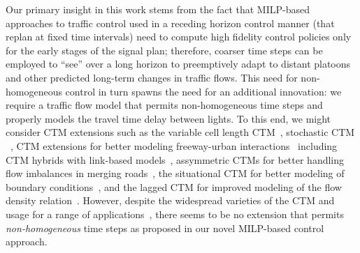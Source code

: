 {Our primary insight in this work stems from the fact that MILP-based
approaches to traffic control used in a receding horizon control
manner (that replan at fixed time intervals) need to compute high
fidelity control policies only for the early stages of the signal
plan; therefore, coarser time steps can be employed to ``see'' over a
long horizon to preemptively adapt to distant platoons and other
predicted long-term changes in traffic flows.
This need for non-homogeneous control in
turn spawns the need for an additional innovation: we require a
traffic flow
model that permits non-homogeneous time steps and properly models the
travel time delay between lights.  To this end, we might consider CTM
extensions such as the variable cell length
CTM~, stochastic CTM
~,
CTM extensions for better modeling freeway-urban
interactions~ including CTM hybrids with
link-based models~, assymmetric
CTMs for better handling flow imbalances in merging
roads~, the situational CTM for better
modeling of boundary conditions~, and the
lagged CTM for improved modeling of the flow density
relation~.  However, despite the widespread
varieties of the CTM and usage for a range of
applications~, there seems to be
no extension that permits \emph{non-homogeneous} time steps as proposed in
our novel MILP-based control approach.

}
